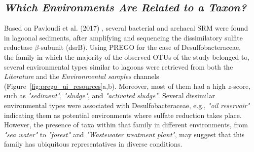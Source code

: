    \subsection*{\textit{Which Environments Are Related to a Taxon?}}
   \label{subsec:envo-taxa}

   Based on Pavloudi et al. (2017) \parencite{pavloudi2017diversity}, several bacterial and archaeal SRM were found in lagoonal sediments, after amplifying and sequencing the dissimilatory sulfite reductase $\beta$-subunit (dsrB). 
   Using PREGO for the case of Desulfobacteraceae, the family in which the majority of the observed OTUs of the study belonged to, several environmental types similar to lagoons were retrieved from both the \textit{Literature} and the \textit{Environmental samples} channels (Figure~\ref{fig:prego_ui_resources}a,b). Moreover, most of them had a high $z$-score, such as \textit{"sediment"}, \textit{"sludge"}, and \textit{"activated sludge"}. 
   Several dissimilar environmental types were associated with Desulfobacteraceae, e.g., \textit{"oil reservoir"} indicating them as potential environments where sulfate reduction takes place. 
   However, the presence of taxa within that family in different environments, from \textit{"sea water"} to \textit{"forest"} and \textit{"Wastewater treatment plant"}, may suggest that this family has ubiquitous representatives in diverse conditions.

